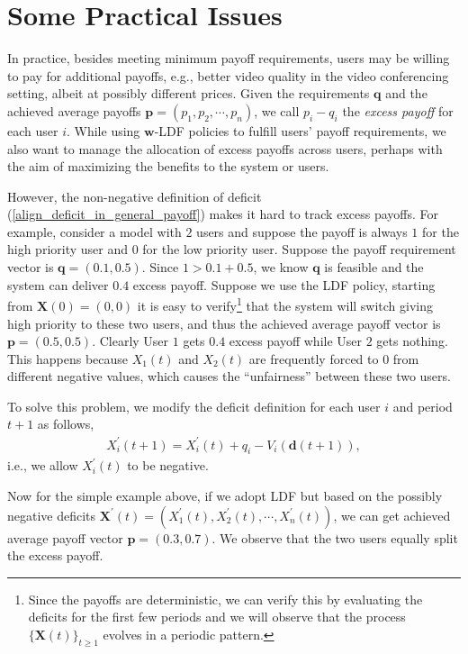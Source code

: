 \documentclass[prodmode,acmtompecs]{acmsmall}
\newcommand{\reqvec}{\mathbf{q}}
\newcommand{\reqscalar}{q}
\begin{document}
\section{Some Practical Issues}
In practice, besides meeting minimum payoff requirements, users may be willing to pay for additional payoffs, e.g., better video quality in the video conferencing setting, albeit at possibly different prices. 
Given the requirements $\reqvec$ and the achieved average payoffs $\mathbf{p} = (p_1, p_2, \cdots, p_n)$, we call $p_i - \reqscalar_i$ the {\em excess payoff} for each user $i$. While using $\mathbf{w}$-LDF policies to fulfill users' payoff requirements, we also want to manage the allocation of excess payoffs across users, perhaps with the aim of maximizing the benefits to the system or users. 

However, the non-negative definition of deficit (\ref{align_deficit_in_general_payoff}) makes it hard to track excess payoffs. For example, consider a model with $2$ users and suppose the payoff is always $1$ for the high priority user and $0$ for the low priority user. 
Suppose the payoff requirement vector is $\reqvec = (0.1, 0.5)$. Since $1 > 0.1 + 0.5$, we know $\reqvec$ is feasible and the system can deliver $0.4$ excess payoff. 
Suppose we use the LDF policy, starting from $\mathbf{X}(0) = (0, 0)$ it is easy to verify\footnote{Since the payoffs are deterministic, we can verify this by evaluating the deficits for the first few periods and we will observe that the process $\{\mathbf{X}(t)\}_{t\geq 1}$ evolves in a periodic pattern. } that the system will switch giving high priority to these two users, and thus the achieved average payoff vector is $\mathbf{p} = (0.5, 0.5)$. Clearly User $1$ gets $0.4$ excess payoff while User $2$ gets nothing. 
This happens because $X_1(t)$ and $X_2(t)$ are frequently forced to $0$ from different negative values, which causes the ``unfairness'' between these two users. 

To solve this problem, we modify the deficit definition for each user $i$ and period $t+1$ as follows, 
\begin{align}
\label{align_deficit_possibly_negative}
X_i^\prime(t+1) = X_i^\prime(t) + \reqscalar_i - V_i(\mathbf{d}(t+1)), 
\end{align}
i.e., we allow $X_i^\prime(t)$ to be negative. 

Now for the simple example above, if we adopt LDF but based on the possibly negative deficits $\mathbf{X}^\prime(t) = (X_1^\prime(t), X_2^\prime(t), \cdots, X_n^\prime(t))$, we can get achieved average payoff vector $\mathbf{p} = (0.3, 0.7)$. We observe that the two users equally split the excess payoff. 
\end{document}

